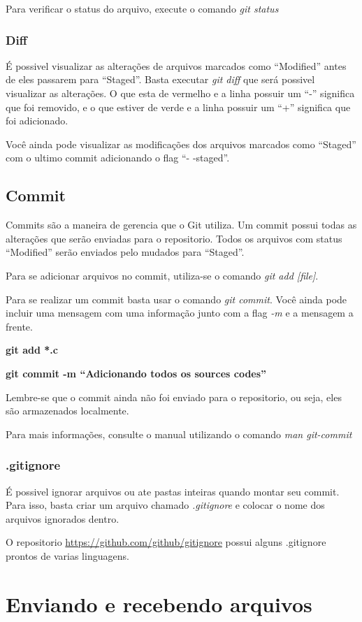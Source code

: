 \documentclass[]{article}
\begin{document}
Para verificar o status do arquivo, execute o comando \textit{git status}
\subsubsection*{Diff}
É possivel visualizar as alterações de arquivos marcados como ``Modified'' antes de eles passarem para ``Staged''. 
Basta executar \textit{git diff} que será possivel visualizar as alterações.
O que esta de vermelho e a linha possuir um ``-'' significa que foi removido, e o que estiver de verde e a linha possuir um ``+'' significa que foi adicionado.


Você ainda pode visualizar as modificações dos arquivos marcados como ``Staged'' com o ultimo commit adicionando o flag ``- -staged''.

\subsection*{Commit}
Commits são a maneira de gerencia que o Git utiliza. Um commit possui todas as alterações que serão enviadas para o repositorio.
Todos os arquivos com status ``Modified'' serão enviados pelo mudados para ``Staged''.

 Para se adicionar arquivos no commit, utiliza-se o comando \textit{git add [file]}.

 Para se realizar um commit basta usar o comando \textit{git commit}. 
 Você ainda pode incluir uma mensagem com uma informação junto com a flag \textit{-m} e a mensagem a frente.

 
 \textbf{git add *.c}


 \textbf{git commit -m ``Adicionando todos os sources codes''}

 Lembre-se que o commit ainda não foi enviado para o repositorio, ou seja, eles são armazenados localmente.

 Para mais informações, consulte o manual utilizando o comando \textit{man git-commit}
 \subsubsection*{.gitignore}
 É possivel ignorar arquivos ou ate pastas inteiras quando montar seu commit.
 Para isso, basta criar um arquivo chamado \textit{.gitignore} e colocar o nome dos arquivos ignorados dentro.

 O repositorio \url{https://github.com/github/gitignore} possui alguns .gitignore prontos de varias linguagens.

 
\section{Enviando e recebendo arquivos}
\end{document}
